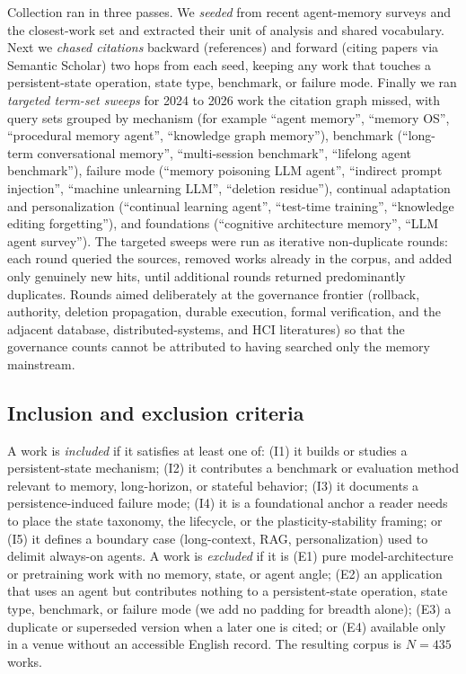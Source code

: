 Collection ran in three passes. We \emph{seeded} from recent agent-memory surveys
and the closest-work set and extracted their unit of analysis and shared
vocabulary. Next we \emph{chased citations} backward (references) and forward
(citing papers via Semantic Scholar) two hops from each seed, keeping any work
that touches a persistent-state operation, state type, benchmark, or failure
mode. Finally we ran \emph{targeted term-set sweeps} for 2024 to 2026 work the
citation graph missed, with query sets grouped by mechanism (for example
``agent memory'', ``memory OS'', ``procedural memory agent'', ``knowledge graph
memory''), benchmark (``long-term conversational memory'', ``multi-session
benchmark'', ``lifelong agent benchmark''), failure mode (``memory poisoning LLM
agent'', ``indirect prompt injection'', ``machine unlearning LLM'', ``deletion
residue''), continual adaptation and personalization (``continual learning
agent'', ``test-time training'', ``knowledge editing forgetting''), and
foundations (``cognitive architecture memory'', ``LLM agent survey''). The
targeted sweeps were run as iterative non-duplicate rounds: each round queried
the sources, removed works already in the corpus, and added only genuinely new
hits, until additional rounds returned predominantly duplicates. Rounds aimed
deliberately at the governance frontier (rollback, authority, deletion
propagation, durable execution, formal verification, and the adjacent database,
distributed-systems, and HCI literatures) so that the governance counts cannot be
attributed to having searched only the memory mainstream.

\subsection{Inclusion and exclusion criteria}

A work is \emph{included} if it satisfies at least one of: (I1) it builds or
studies a persistent-state mechanism; (I2) it contributes a benchmark or
evaluation method relevant to memory, long-horizon, or stateful behavior; (I3) it
documents a persistence-induced failure mode; (I4) it is a foundational anchor a
reader needs to place the state taxonomy, the lifecycle, or the
plasticity-stability framing; or (I5) it defines a boundary case (long-context,
RAG, personalization) used to delimit always-on agents. A work is \emph{excluded}
if it is (E1) pure model-architecture or pretraining work with no memory, state,
or agent angle; (E2) an application that uses an agent but contributes nothing to
a persistent-state operation, state type, benchmark, or failure mode (we add no
padding for breadth alone); (E3) a duplicate or superseded version when a later
one is cited; or (E4) available only in a venue without an accessible English
record. The resulting corpus is $N{=}435$ works.

